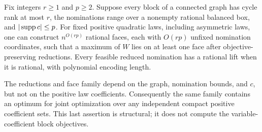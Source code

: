 \begin{theorem}
\label{thm:a-wcac-faces}
Fix integers $r\ge1$ and $p\ge2$. Suppose every block of a connected graph
has cycle rank at most $r$, the nominations range over a nonempty rational
balanced box, and $|\operatorname{supp} c|\le p$. For fixed positive quadratic laws,
including asymmetric laws, one can construct $n^{O(rp)}$ rational faces,
each with $O(rp)$ unfixed nomination coordinates, such that a maximum of
$W$ lies on at least one face after objective-preserving reductions.
Every feasible reduced nomination has a rational lift when it is rational,
with polynomial encoding length.

The reductions and face family depend on the graph, nomination bounds,
and $c$, but not on the positive law coefficients. Consequently the same
family contains an optimum for joint optimization over any independent
compact positive coefficient sets. This last assertion is structural;
it does not compute the variable-coefficient block objectives.
\end{theorem}
